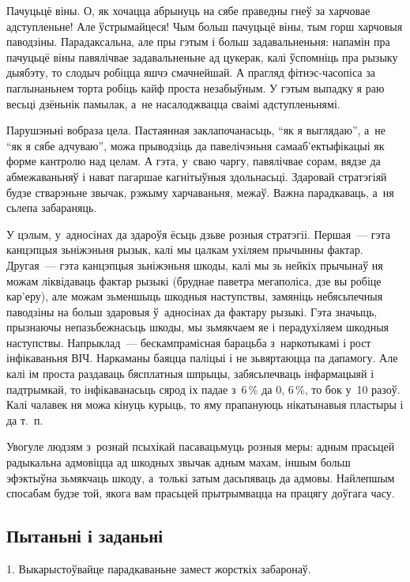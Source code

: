 Пачуцьцё віны. О, як хочацца абрынуць на сябе праведны гнеў за харчовае адступленьне! Але ўстрымайцеся! Чым больш пачуцьцё віны, тым горш харчовыя паводзіны. Парадаксальна, але пры гэтым і больш задавальненьня: напамін пра пачуцьцё віны павялічвае задавальненьне ад цукерак, калі ўспомніць пра рызыку дыябэту, то слодыч робіцца яшчэ смачнейшай. А прагляд фітнэс-часопіса за паглынаньнем торта робіць кайф проста незабыўным. У гэтым выпадку я раю весьці дзёньнік памылак, а~не насалоджвацца сваімі адступленьнямі.

Парушэньні вобраза цела. Пастаянная заклапочанасьць, ``як я выглядаю'', а~не ``як я сябе адчуваю'', можа прыводзіць да павелічэньня самааб'ектыфікацыі як форме кантролю над целам. А гэта, у~сваю чаргу, павялічвае сорам, вядзе да абмежаваньняў і нават пагаршае кагнітыўныя здольнасьці. Здаровай стратэгіяй будзе стварэньне звычак, рэжыму харчаваньня, межаў. Важна парадкаваць, а~ня сьлепа забараняць.

У цэлым, у~адносінах да здароўя ёсьць дзьве розныя стратэгіі. Першая~--- гэта канцэпцыя зьніжэньня рызык, калі мы цалкам ухіляем прычынны фактар. Другая~--- гэта канцэпцыя зьніжэньня шкоды, калі мы зь нейкіх прычынаў ня можам ліквідаваць фактар рызыкі (бруднае паветра мегаполіса, дзе вы робіце кар'еру), але можам зьменшыць шкодныя наступствы, замяніць небясьпечныя паводзіны на больш здаровыя ў~адносінах да фактару рызыкі. Гэта значыць, прызнаючы непазьбежнасьць шкоды, мы зьмякчаем яе і перадухіляем шкодныя наступствы. Напрыклад~--- бескампрамісная барацьба з~наркотыкамі і рост інфікаваньня ВІЧ. Наркаманы баяцца паліцыі і не зьвяртаюцца па дапамогу. Але калі ім проста раздаваць бясплатныя шпрыцы, забясьпечваць інфармацыяй і падтрымкай, то інфікаванасьць сярод іх падае з~6\,\% да 0, 6\,\%, то бок у~10 разоў. Калі чалавек ня можа кінуць курыць, то яму прапануюць нікатынавыя пластыры і да т.~п.

Увогуле людзям з~рознай псыхікай пасавацьмуць розныя меры: адным прасьцей радыкальна адмовіцца ад шкодных звычак адным махам, іншым больш эфэктыўна зьмякчаць шкоду, а~толькі затым дасьпяваць да адмовы. Найлепшым спосабам будзе той, якога вам прасьцей прытрымвацца на працягу доўгага часу.

\subsection*{Пытаньні і заданьні}

1. Выкарыстоўвайце парадкаваньне замест жорсткіх забаронаў.

